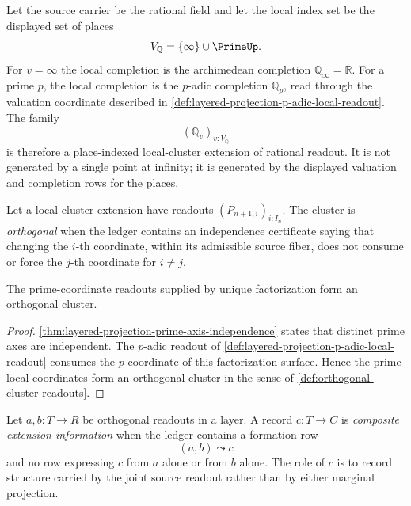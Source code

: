 \begin{example}
\label{ex:place-completions-local-clusters}
Let the source carrier be the rational field and let the local index set
be the displayed set of places
$$
V_{\mathbb Q}=\{\infty\}\cup\PrimeUp.
$$
For $v=\infty$ the local completion is the archimedean completion
$\mathbb Q_\infty=\mathbb R$. For a prime $p$, the local completion is
the $p$-adic completion $\mathbb Q_p$, read through the valuation
coordinate described in
\autoref{def:layered-projection-p-adic-local-readout}. The family
$$
(\mathbb Q_v)_{v:V_{\mathbb Q}}
$$
is therefore a place-indexed local-cluster extension of rational
readout. It is not generated by a single point at infinity; it is
generated by the displayed valuation and completion rows for the places.
\end{example}

\begin{definition}
\label{def:orthogonal-cluster-readouts}
Let a local-cluster extension have readouts
$(P_{n+1,i})_{i:I_n}$. The cluster is \emph{orthogonal} when the ledger
contains an independence certificate saying that changing the $i$-th
coordinate, within its admissible source fiber, does not consume or
force the $j$-th coordinate for $i\ne j$.
\end{definition}

\begin{theorem}
\label{thm:prime-coordinate-clusters-orthogonal}
The prime-coordinate readouts supplied by unique factorization form an
orthogonal cluster.
\end{theorem}

\begin{proof}
\autoref{thm:layered-projection-prime-axis-independence} states that
distinct prime axes are independent. The $p$-adic readout of
\autoref{def:layered-projection-p-adic-local-readout} consumes the
$p$-coordinate of this factorization surface. Hence the prime-local
coordinates form an orthogonal cluster in the sense of
\autoref{def:orthogonal-cluster-readouts}.
\end{proof}

\begin{definition}
\label{def:composite-extension-information}
Let $a,b:T\to R$ be orthogonal readouts in a layer. A record
$c:T\to C$ is \emph{composite extension information} when the ledger
contains a formation row
$$
(a,b)\leadsto c
$$
and no row expressing $c$ from $a$ alone or from $b$ alone. The role of
$c$ is to record structure carried by the joint source readout rather
than by either marginal projection.
\end{definition}

